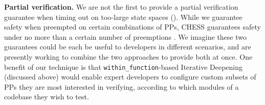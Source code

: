 
{\bf Partial verification.}
We are not the first to provide a partial verification guarantee when timing out on too-large state spaces (\sect{\ref{sec:eval-sssmc}}).
While we guarantee safety when preempted on certain combinations of PPs,
CHESS
guarantees safety under no more than a certain number of preemptions \cite{chess-icb}.
We imagine these two guarantees could be each be useful to developers in different scenarios,
and are presently working to combine the two approaches to provide both at once.
One benefit of our technique is that {\tt within\_function}-based Iterative Deepening (discussed above)
would enable expert developers to configure custom subsets of PPs they are most interested in verifying,
according to which modules of a codebase they wish to test.

